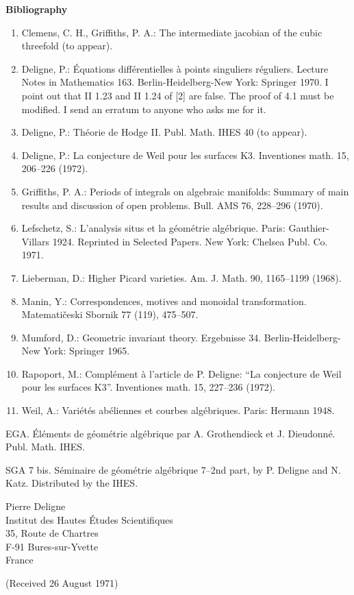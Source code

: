 \documentclass[10pt]{article}
\begin{document}
\begin{center}
\bfseries Bibliography
\end{center}
\begin{enumerate}[label=\arabic*.]
\item Clemens, C. H., Griffiths, P. A.: The intermediate jacobian of the cubic threefold (to appear).
\item Deligne, P.: Équations différentielles à points singuliers réguliers. Lecture Notes in Mathematics 163. Berlin-Heidelberg-New York: Springer 1970. I point out that II 1.23 and II 1.24 of [2] are false. The proof of 4.1 must be modified. I send an erratum to anyone who asks me for it.
\item Deligne, P.: Théorie de Hodge II. Publ. Math. IHES 40 (to appear).
\item Deligne, P.: La conjecture de Weil pour les surfaces K3. Inventiones math. 15, 206--226 (1972).
\item Griffiths, P. A.: Periods of integrals on algebraic manifolds: Summary of main results and discussion of open problems. Bull. AMS 76, 228--296 (1970).
\item Lefschetz, S.: L'analysis situs et la géométrie algébrique. Paris: Gauthier-Villars 1924. Reprinted in Selected Papers. New York: Chelsea Publ. Co. 1971.
\item Lieberman, D.: Higher Picard varieties. Am. J. Math. 90, 1165--1199 (1968).
\item Manin, Y.: Correspondences, motives and monoidal transformation. Matematičeski Sbornik 77 (119), 475--507.
\item Mumford, D.: Geometric invariant theory. Ergebnisse 34. Berlin-Heidelberg-New York: Springer 1965.
\item Rapoport, M.: Complément à l'article de P. Deligne: ``La conjecture de Weil pour les surfaces K3''. Inventiones math. 15, 227--236 (1972).
\item Weil, A.: Variétés abéliennes et courbes algébriques. Paris: Hermann 1948.
\end{enumerate}
\noindent EGA. Éléments de géométrie algébrique par A. Grothendieck et J. Dieudonné. Publ. Math. IHES.

\noindent SGA 7 bis. Séminaire de géométrie algébrique 7--2nd part, by P. Deligne and N. Katz. Distributed by the IHES.

\begin{flushright}
Pierre Deligne\\
Institut des Hautes Études Scientifiques\\
35, Route de Chartres\\
F-91 Bures-sur-Yvette\\
France
\end{flushright}

\begin{center}
(Received 26 August 1971)
\end{center}
\end{document}
